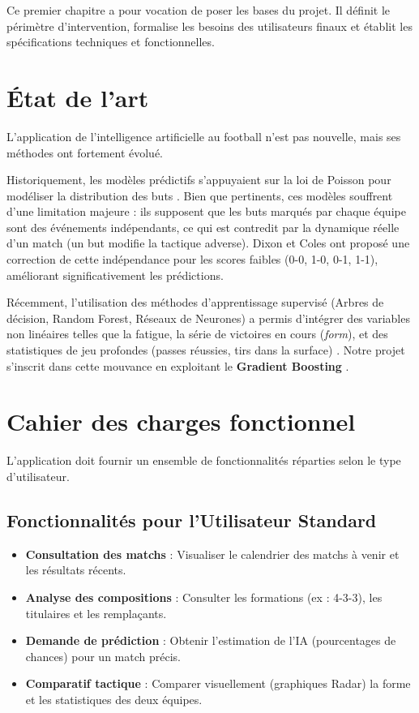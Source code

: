 \documentclass[12pt,a4paper,oneside]{book}
\begin{document}
Ce premier chapitre a pour vocation de poser les bases du projet. Il définit le périmètre d'intervention, formalise les besoins des utilisateurs finaux et établit les spécifications techniques et fonctionnelles.

\section{État de l'art}
L'application de l'intelligence artificielle au football n'est pas nouvelle, mais ses méthodes ont fortement évolué.

Historiquement, les modèles prédictifs s'appuyaient sur la loi de Poisson pour modéliser la distribution des buts \cite{maher1982}. Bien que pertinents, ces modèles souffrent d'une limitation majeure : ils supposent que les buts marqués par chaque équipe sont des événements indépendants, ce qui est contredit par la dynamique réelle d'un match (un but modifie la tactique adverse). Dixon et Coles \cite{dixon1997} ont proposé une correction de cette indépendance pour les scores faibles (0-0, 1-0, 0-1, 1-1), améliorant significativement les prédictions.

Récemment, l'utilisation des méthodes d'apprentissage supervisé (Arbres de décision, Random Forest, Réseaux de Neurones) a permis d'intégrer des variables non linéaires telles que la fatigue, la série de victoires en cours (\textit{form}), et des statistiques de jeu profondes (passes réussies, tirs dans la surface) \cite{bunker2019}. Notre projet s'inscrit dans cette mouvance en exploitant le \textbf{Gradient Boosting} \cite{chen2016xgboost}.

\section{Cahier des charges fonctionnel}
L'application doit fournir un ensemble de fonctionnalités réparties selon le type d'utilisateur.

\subsection{Fonctionnalités pour l'Utilisateur Standard}
\begin{itemize}
    \item \textbf{Consultation des matchs} : Visualiser le calendrier des matchs à venir et les résultats récents.
    \item \textbf{Analyse des compositions} : Consulter les formations (ex : 4-3-3), les titulaires et les remplaçants.
    \item \textbf{Demande de prédiction} : Obtenir l'estimation de l'IA (pourcentages de chances) pour un match précis.
    \item \textbf{Comparatif tactique} : Comparer visuellement (graphiques Radar) la forme et les statistiques des deux équipes.
\end{itemize}
\end{document}
